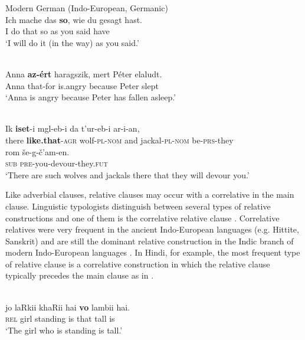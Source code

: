 \documentclass[output=paper,colorlinks,citecolor=brown]{langscibook}
\begin{document}
\ea\label{ex:diessel:38}
{Modern German (Indo-European, Germanic)}\\
\gll Ich  mache  das   \textbf{so},  wie  du  gesagt  hast.\\
     I  do  that   so  as  you  said  have\\
\glt ‘I will do it (in the way) as you said.’
\z

\ea\label{ex:diessel:39}
\\
\gll Anna   \textbf{az-ért}  haragszik,   mert    Péter  elaludt.\\
     Anna   that-for  is.angry      because   Peter  slept\\
\glt ‘Anna is angry because Peter has fallen asleep.’
\z

\ea\label{ex:diessel:40}
\\
\gll Ik    \textbf{iset}-i      mgl-eb-i    da   t’ur-eb-i ar-i-an,\\
     there \textbf{like.that}-\textsc{agr}  wolf-\textsc{pl-nom}   and   jackal-\textsc{pl-nom} be-\textsc{prs}-they\\
\gll rom   še-g-č’am-en.\\
     \textsc{sub}   \textsc{pre-}you-devour-they.\textsc{fut}\\
\glt ‘There are such wolves and jackals there that they will devour you.’
\z

Like adverbial clauses, relative clauses may occur with a correlative in the main clause. Linguistic typologists distinguish between several types of relative constructions and one of them is the correlative relative clause \citep{Lipták2009}. Correlative relatives were very frequent in the ancient Indo-European languages (e.g. Hittite, Sanskrit) and are still the dominant relative construction in the Indic branch of modern Indo-European languages \citep{Srivastav1991}. In Hindi, for example, the most frequent type of relative clause is a correlative construction in which the relative clause typically precedes the main clause as in .

\ea\label{ex:diessel:41}
\\
\gll {\ob}jo  laRkii  khaRii hai{\cb} \textbf{vo}  lambii  hai.\\
     {\db}\textsc{rel}    girl  standing is that  tall  is\\
\glt ‘The girl who is standing is tall.’
\z
\end{document}
